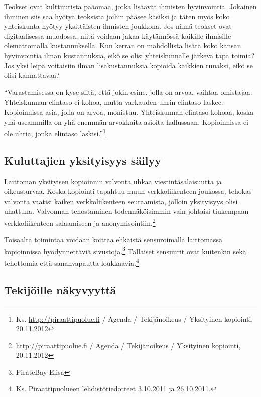 \documentclass[titlepage,12pt]{article}
\begin{document}


Teokset ovat kulttuurista pääomaa, jotka lisäävät ihmisten
hyvinvointia.  Jokainen ihminen siis saa hyötyä teoksista joihin
pääsee käsiksi ja täten myös koko yhteiskunta hyötyy yksittäisten
ihmisten joukkona.  Jos nämä teokset ovat digitaalisessa muodossa,
niitä voidaan jakaa käytännössä kaikille ihmisille olemattomalla
kustannuksella.  Kun kerran on mahdollista lisätä koko kansan
hyvinvointia ilman kustannuksia, eikö se olisi yhteiskunnalle järkevä
tapa toimia?  Jos yksi leipä voitaisiin ilman lisäkustannuksia
kopioida kaikkien ruuaksi, eikö se olisi kannattavaa?

``Varastamisessa on kyse siitä, että jokin esine, jolla on arvoa,
vaihtaa omistajaa.  Yhteiskunnan elintaso ei kohoa, mutta varkauden
uhrin elintaso laskee. Kopioinnissa asia, jolla on arvoa, monistuu.
Yhteiskunnan elintaso kohoaa, koska yhä useammilla on yhä enemmän
arvokkaita asioita hallussaan.  Kopioinnissa ei ole uhria, jonka
elintaso laskisi.''\footnote{Ks. \url{http://piraattipuolue.fi} /
  Agenda / Tekijänoikeus / Yksityinen kopiointi, 20.11.2012}

\subsection{Kuluttajien yksityisyys säilyy}

Laittoman yksityisen kopioinnin valvonta uhkaa viestintäsalaisuutta ja
oikeusturvaa.  Koska kopiointi tapahtuu muun verkkoliikenteen
joukossa, tehokas valvonta vaatisi kaiken verkkoliikenteen
seuraamista, jolloin yksityisyys olisi uhattuna.  Valvonnan
tehostaminen todennäköisimmin vain johtaisi tiukempaan
verkkoliikenteen salaamiseen ja
anonymisointiin.\footnote{\url{http://piraattipuolue.fi} / Agenda /
  Tekijänoikeus / Yksityinen kopiointi, 20.11.2012} 

Toisaalta toimintaa voidaan koittaa ehkäistä sensuroimalla laittomassa
kopioinnissa hyödynnettäviä sivustoja.\footnote{PirateBay Elisa}
Tällaiset sensuurit ovat kuitenkin sekä tehottomia että sananvapautta
loukkaavia.\footnote{Ks. Piraattipuolueen lehdistötiedotteet 3.10.2011
  ja 26.10.2011.}

\subsection{Tekijöille näkyvyyttä}
\end{document}
